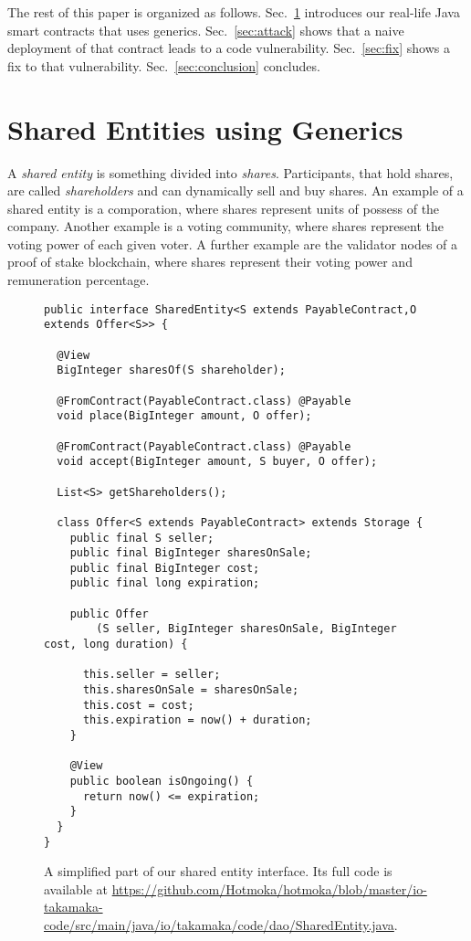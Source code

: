 \documentclass{llncs}
\begin{document}
The rest of this paper is organized as follows.
Sec.~\ref{sec:shared_entities} introduces our real-life Java smart
contracts that uses generics. Sec.~\ref{sec:attack} shows that a naive
deployment of that contract leads to a code vulnerability.
Sec.~\ref{sec:fix} shows a fix to that vulnerability.
Sec.~\ref{sec:conclusion} concludes.

\section{Shared Entities using Generics}\label{sec:shared_entities}

A \emph{shared entity} is something divided into \emph{shares}. Participants,
that hold shares, are called \emph{shareholders} and can dynamically
sell and buy shares. An example of a shared entity is a comporation,
where shares represent units of possess of the company. Another example is
a voting community, where shares represent the voting power of each given voter.
A further example are the validator nodes of a proof of stake blockchain,
where shares represent their voting power and remuneration percentage.

\begin{figure}[t]
  \begin{center}
    \begin{lstlisting}[language=Takamaka]
public interface SharedEntity<S extends PayableContract,O extends Offer<S>> {

  @View
  BigInteger sharesOf(S shareholder);

  @FromContract(PayableContract.class) @Payable
  void place(BigInteger amount, O offer);

  @FromContract(PayableContract.class) @Payable
  void accept(BigInteger amount, S buyer, O offer);

  List<S> getShareholders();

  class Offer<S extends PayableContract> extends Storage {
    public final S seller;
    public final BigInteger sharesOnSale;
    public final BigInteger cost;
    public final long expiration;

    public Offer
        (S seller, BigInteger sharesOnSale, BigInteger cost, long duration) {

      this.seller = seller;
      this.sharesOnSale = sharesOnSale;
      this.cost = cost;
      this.expiration = now() + duration;
    }

    @View
    public boolean isOngoing() {
      return now() <= expiration;
    }
  }
}
    \end{lstlisting}
  \end{center}
  \caption{A simplified part of our shared entity interface.
  Its full code is available at \url{https://github.com/Hotmoka/hotmoka/blob/master/io-takamaka-code/src/main/java/io/takamaka/code/dao/SharedEntity.java}.}\label{fig:shared_entity}
\end{figure}
\end{document}
